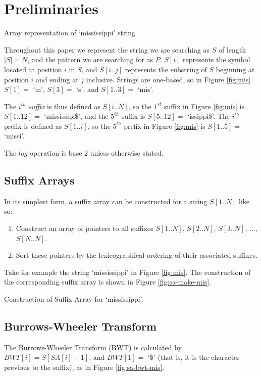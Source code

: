 \section{Preliminaries}

			{Array representation of	`mississippi' string}
			
Throughout this paper we represent the string we are searching as $S$ of length 
$|S| = N$, and the pattern we are searching for as $P$. $S[i]$ represents the 
symbol located at position $i$ in $S$, and $S[i..j]$ represents the substring of 
$S$ beginning at position $i$ and ending at $j$ inclusive. Strings are 
one-based, so in Figure \ref{fig:mis} $S[1] = $ `m', $S[3] = $ `s', and $S[1..3] 
= $ `mis'.

The $i^{th}$ \emph{suffix} is thus defined as $S[i..N]$, so the $1^{st}$ suffix 
in Figure \ref{fig:mis} is $S[1..12] = $ `mississipi\$', and the $5^{th}$ suffix 
is $S[5..12] = $ `issippi\$'. The $i^{th}$ prefix is defined as $S[1..i]$, so
the $5^{th}$ prefix in Figure \ref{fig:mis} is $S[1..5] = $ `missi'.

The $log$ operation is base 2 unless otherwise stated.

\subsection{Suffix Arrays}
In its simplest form, a suffix array can be constructed for a string
$S[1..N]$ like so:

\begin{enumerate}
	\item
		Construct an array of pointers to all suffixes $S[1..N]$, 
		$S[2..N]$, $S[3..N]$, ..., $S[N..N]$.
	\item
		Sort these pointers by the lexicographical ordering of their associated
		suffixes.
\end{enumerate}

Take for example the string `mississippi' in Figure \ref{fig:mis}.
The construction of the corresponding suffix array is shown in Figure
\ref{fig:sa-make-mis}.

			{Construction of Suffix Array for `mississippi'.}



\subsection{Burrows-Wheeler Transform}
The Burrows-Wheeler Transform (BWT) is calculated by $BWT[i] = S[SA[i]-1]$, and $BWT[1] = $ `\$' (that is, it is the character previous to the suffix), as in Figure \ref{fig:sa-bwt-mis}.

